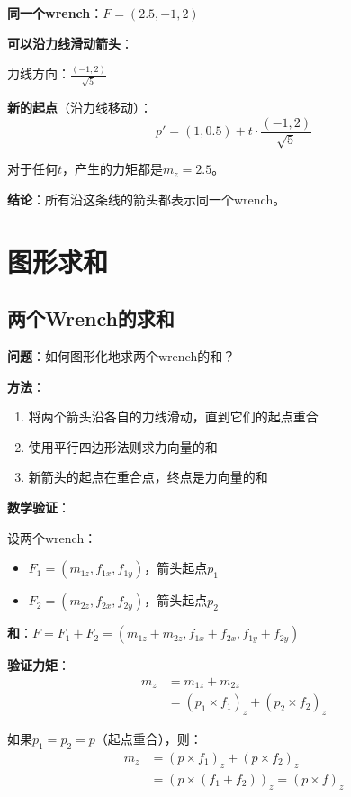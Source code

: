\documentclass[12pt,a4paper]{article}
\begin{document}
\textbf{同一个wrench}：$F = (2.5, -1, 2)$

\textbf{可以沿力线滑动箭头}：

力线方向：$\frac{(-1, 2)}{\sqrt{5}}$

\textbf{新的起点}（沿力线移动）：
\begin{equation}
p' = (1, 0.5) + t \cdot \frac{(-1, 2)}{\sqrt{5}}
\end{equation}

对于任何$t$，产生的力矩都是$m_z = 2.5$。

\textbf{结论}：所有沿这条线的箭头都表示同一个wrench。

\section{图形求和}

\subsection{两个Wrench的求和}

\textbf{问题}：如何图形化地求两个wrench的和？

\textbf{方法}：
\begin{enumerate}
\item 将两个箭头沿各自的力线滑动，直到它们的起点重合
\item 使用平行四边形法则求力向量的和
\item 新箭头的起点在重合点，终点是力向量的和
\end{enumerate}

\textbf{数学验证}：

设两个wrench：
\begin{itemize}
\item $F_1 = (m_{1z}, f_{1x}, f_{1y})$，箭头起点$p_1$
\item $F_2 = (m_{2z}, f_{2x}, f_{2y})$，箭头起点$p_2$
\end{itemize}

\textbf{和}：$F = F_1 + F_2 = (m_{1z} + m_{2z}, f_{1x} + f_{2x}, f_{1y} + f_{2y})$

\textbf{验证力矩}：
\begin{align}
m_z &= m_{1z} + m_{2z} \\
&= (p_1 \times f_1)_z + (p_2 \times f_2)_z
\end{align}

如果$p_1 = p_2 = p$（起点重合），则：
\begin{align}
m_z &= (p \times f_1)_z + (p \times f_2)_z \\
&= (p \times (f_1 + f_2))_z = (p \times f)_z
\end{align}
\end{document}
